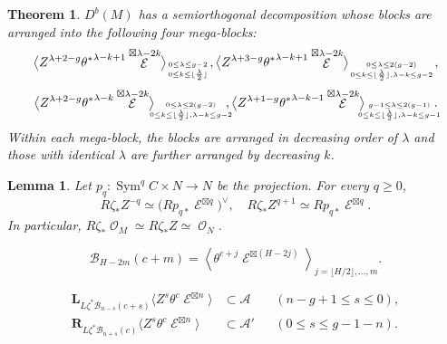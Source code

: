 \documentclass[10pt,a4paper]{amsart}
\newtheorem{theorem}{Theorem}
\newtheorem{lemma}{Lemma}
\DeclareMathOperator{\Sym}{Sym}
\DeclareMathOperator{\cE}{\mathcal{E}}
\DeclareMathOperator{\cO}{\mathcal{O}}
\begin{document}
\begin{theorem}\label{LoomTheorem}
$D^b(M)$ has a semiorthogonal decomposition whose blocks are arranged into
the following four mega-blocks:
$$
\bigl\langle 
Z^{\lambda+2-g}{\theta^*}^{\lambda-k+1}\cE^{\boxtimes \lambda-2k}
\bigr\rangle_{0\le \lambda\le g-2 \atop 0\le k\le \lfloor{\lambda\over2}\rfloor},\bigl\langle 
Z^{\lambda+3-g}{\theta^*}^{\lambda-k+1}\cE^{\boxtimes \lambda-2k}
\bigr\rangle_{0\le \lambda\le 2(g-2) \atop 0\le k\le  \lfloor{\lambda\over2}\rfloor, \lambda-k\le g-2},$$
$$\bigl\langle 
Z^{\lambda+2-g}{\theta^*}^{\lambda-k}\cE^{\boxtimes \lambda-2k}
\bigr\rangle\!\!\!{}_{0\le \lambda\le 2(g-2) \atop 0\le k\le \lfloor{\lambda\over2}\rfloor, \lambda-k\le g-2}\!\!\!\!,
\bigl\langle 
Z^{\lambda+1-g}{\theta^*}^{\lambda-k-1}\cE^{\boxtimes \lambda-2k}
\bigr\rangle\!\!\!\!{}_{g-1\le \lambda\le 2(g-1) \atop 0\le k\le  \lfloor{\lambda\over2}\rfloor, \lambda-k\le g-1}\!\!\!\!.
$$ 
Within each mega-block, the blocks are arranged in decreasing order of $\lambda$
and those with identical $\lambda$ are further arranged by decreasing $k$.
\end{theorem}

\begin{lemma}\label{pw:direct-images}
Let $p_q:\Sym^qC\times N\to N$ be the projection.  For every $q\geq0$,
$$ R\zeta_*Z^{-q}\simeq
       \bigl(Rp_{q*}\cE^{\boxtimes q}\bigr)^\vee,
 \quad
 R\zeta_*Z^{q+1}\simeq Rp_{q*}\cE^{\boxtimes q}.
$$In particular, $R\zeta_*\cO_M\simeq R\zeta_*Z\simeq\cO_N$.
\end{lemma}

\begin{equation}\label{pw:prefix}
 \mathcal B_{H-2m}(c+m)=
 \left\langle\theta^{c+j}\cE^{\boxtimes(H-2j)}
 \right\rangle_{j=\lfloor H/2\rfloor,\ldots,m}.
\end{equation}

\begin{align}
 \mathbf L_{L\zeta^*\mathcal B_{n-s}(c+s)}
       \langle Z^s\theta^c\cE^{\boxtimes n}\rangle
       &\subset\mathcal A
       &&(n-g+1\le s\le0),\label{pw:left-mutation}\\
 \mathbf R_{L\zeta^*\mathcal B_{n+s}(c)}
       \langle Z^s\theta^c\cE^{\boxtimes n}\rangle
       &\subset\mathcal A'
       &&(0\le s\le g-1-n).\label{pw:right-mutation}
\end{align}
\end{document}
